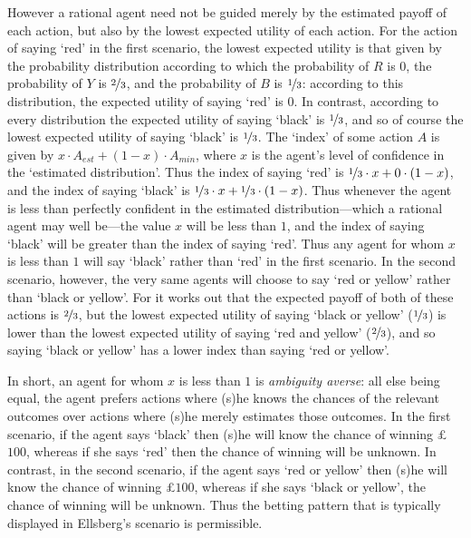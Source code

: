 However a rational agent need not be guided merely by the estimated payoff of each action, but also by the lowest expected utility of each action. For the action of saying `red' in the first scenario, the lowest expected utility is that given by the probability distribution according to which the probability of $R$ is $0$, the probability of $Y$ is $\nicefrac{2}{3}$, and the probability of $B$ is $\nicefrac{1}{3}$: according to this distribution, the expected utility of saying `red' is $0$. In contrast, according to every distribution the expected utility of saying `black' is $\nicefrac{1}{3}$, and so of course the lowest expected utility of saying `black' is $\nicefrac{1}{3}$. The `index' of some action $A$ is given by $x \cdot A_{est} + (1-x) \cdot A_{min}$, where $x$ is the agent's level of confidence in the `estimated distribution'. Thus the index of saying `red' is $\nicefrac{1}{3} \cdot x + 0 \cdot (1-x)$, and the index of saying `black' is $\nicefrac{1}{3} \cdot x + \nicefrac{1}{3} \cdot (1-x)$. Thus whenever the agent is less than perfectly confident in the estimated distribution---which a rational agent may well be---the value $x$ will be less than $1$, and the index of saying `black' will be greater than the index of saying `red'. Thus any agent for whom $x$ is less than $1$ will say `black' rather than `red' in the first scenario. In the second scenario, however, the very same agents will choose to say `red or yellow' rather than `black or yellow'. For it works out that the expected payoff of both of these actions is $\nicefrac{2}{3}$, but the lowest expected utility of saying `black or yellow' ($\nicefrac{1}{3}$) is lower than the lowest expected utility of saying `red and yellow' ($\nicefrac{2}{3}$), and so saying `black or yellow' has a lower index than saying `red or yellow'.

In short, an agent for whom $x$ is less than $1$ is \textit{ambiguity averse}: all else being equal, the agent prefers actions where (s)he knows the chances of the relevant outcomes over actions where (s)he merely estimates those outcomes. In the first scenario, if the agent says `black' then (s)he will know the chance of winning £$100$, whereas if she says `red' then the chance of winning will be unknown. In contrast, in the second scenario, if the agent says `red or yellow' then (s)he will know the chance of winning £$100$, whereas if she says `black or yellow', the chance of winning will be unknown. Thus the betting pattern that is typically displayed in Ellsberg's scenario is permissible. 

